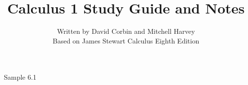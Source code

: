 \documentclass{article}
\begin{document}
\title{Calculus 1 Study Guide and Notes}
\date{}
\author{Written by David Corbin and Mitchell Harvey\\ \small{Based on James Stewart Calculus Eighth Edition}}
\maketitle

Sample 6.1
\end{document}
